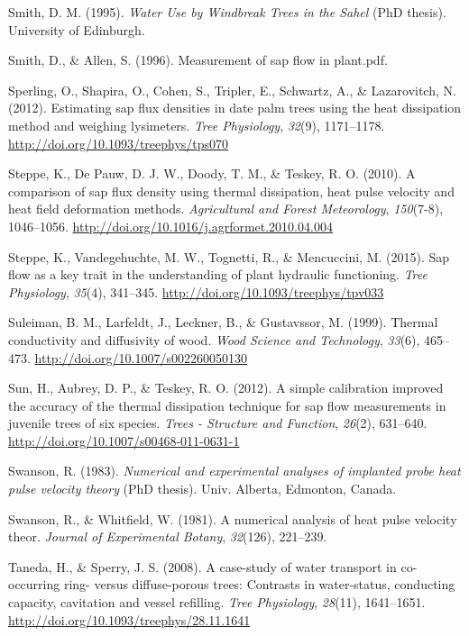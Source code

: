 \documentclass[11pt,twoside]{reedthesis}
\begin{document}
\hypertarget{ref-Smith1995}{}
Smith, D. M. (1995). \emph{Water Use by Windbreak Trees in the Sahel}
(PhD thesis). University of Edinburgh.

\hypertarget{ref-Smith1996}{}
Smith, D., \& Allen, S. (1996). Measurement of sap flow in plant.pdf.

\hypertarget{ref-Sperling2012}{}
Sperling, O., Shapira, O., Cohen, S., Tripler, E., Schwartz, A., \&
Lazarovitch, N. (2012). Estimating sap flux densities in date palm trees
using the heat dissipation method and weighing lysimeters. \emph{Tree
Physiology}, \emph{32}(9), 1171--1178.
\url{http://doi.org/10.1093/treephys/tps070}

\hypertarget{ref-Steppe2010}{}
Steppe, K., De Pauw, D. J. W., Doody, T. M., \& Teskey, R. O. (2010). A
comparison of sap flux density using thermal dissipation, heat pulse
velocity and heat field deformation methods. \emph{Agricultural and
Forest Meteorology}, \emph{150}(7-8), 1046--1056.
\url{http://doi.org/10.1016/j.agrformet.2010.04.004}

\hypertarget{ref-Steppe2015}{}
Steppe, K., Vandegehuchte, M. W., Tognetti, R., \& Mencuccini, M.
(2015). Sap flow as a key trait in the understanding of plant hydraulic
functioning. \emph{Tree Physiology}, \emph{35}(4), 341--345.
\url{http://doi.org/10.1093/treephys/tpv033}

\hypertarget{ref-Suleiman1999}{}
Suleiman, B. M., Larfeldt, J., Leckner, B., \& Gustavssor, M. (1999).
Thermal conductivity and diffusivity of wood. \emph{Wood Science and
Technology}, \emph{33}(6), 465--473.
\url{http://doi.org/10.1007/s002260050130}

\hypertarget{ref-Sun2012}{}
Sun, H., Aubrey, D. P., \& Teskey, R. O. (2012). A simple calibration
improved the accuracy of the thermal dissipation technique for sap flow
measurements in juvenile trees of six species. \emph{Trees - Structure
and Function}, \emph{26}(2), 631--640.
\url{http://doi.org/10.1007/s00468-011-0631-1}

\hypertarget{ref-Swanson1983}{}
Swanson, R. (1983). \emph{Numerical and experimental analyses of
implanted probe heat pulse velocity theory} (PhD thesis). Univ. Alberta,
Edmonton, Canada.

\hypertarget{ref-Swanson1981}{}
Swanson, R., \& Whitfield, W. (1981). A numerical analysis of heat pulse
velocity theor. \emph{Journal of Experimental Botany}, \emph{32}(126),
221--239.

\hypertarget{ref-Taneda2008}{}
Taneda, H., \& Sperry, J. S. (2008). A case-study of water transport in
co-occurring ring- versus diffuse-porous trees: Contrasts in
water-status, conducting capacity, cavitation and vessel refilling.
\emph{Tree Physiology}, \emph{28}(11), 1641--1651.
\url{http://doi.org/10.1093/treephys/28.11.1641}
\end{document}
